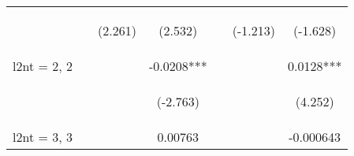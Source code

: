\documentclass[]{article}
\begin{document}
\begin{center}
\begin{tabular}{lcccccc}
        \vspace{4pt}     & \begin{footnotesize}\end{footnotesize}         & \begin{footnotesize}(2.261)\end{footnotesize}  & \begin{footnotesize}(2.532)\end{footnotesize}  & \begin{footnotesize}\end{footnotesize}         & \begin{footnotesize}(-1.213)\end{footnotesize} & \begin{footnotesize}(-1.628)\end{footnotesize} \\
        l2nt = 2, 2      &                                                &                                                & -0.0208***                                     &                                                &                                                & 0.0128***                                      \\
        \vspace{4pt}     & \begin{footnotesize}\end{footnotesize}         & \begin{footnotesize}\end{footnotesize}         & \begin{footnotesize}(-2.763)\end{footnotesize} & \begin{footnotesize}\end{footnotesize}         & \begin{footnotesize}\end{footnotesize}         & \begin{footnotesize}(4.252)\end{footnotesize}  \\
        l2nt = 3, 3      &                                                &                                                & 0.00763                                        &                                                &                                                & -0.000643                                      \\

\end{tabular}
\end{center}
\end{document}
